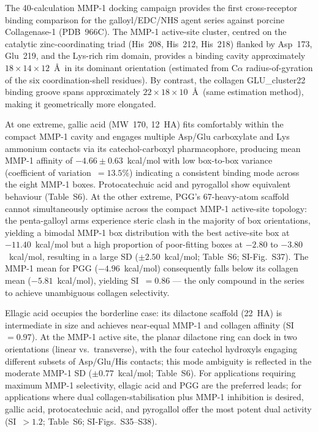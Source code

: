 \documentclass[11pt]{article}
\begin{document}
The 40-calculation MMP-1 docking campaign provides the first cross-receptor
binding comparison for the galloyl/EDC/NHS agent series against porcine
Collagenase-1 (PDB~966C).
The MMP-1 active-site cluster, centred on the catalytic zinc-coordinating
triad (His~208, His~212, His~218) flanked by Asp~173, Glu~219, and the
Lys-rich rim domain, provides a binding cavity approximately
$18 \times 14 \times 12$~\AA\ in its dominant orientation (estimated from
C$\alpha$ radius-of-gyration of the six coordination-shell residues).
By contrast, the collagen GLU\_cluster22 binding groove spans approximately
$22 \times 18 \times 10$~\AA\ (same estimation method), making it
geometrically more elongated.

At one extreme, gallic acid (MW~170, 12~HA) fits comfortably within the compact
MMP-1 cavity and engages multiple Asp/Glu carboxylate and Lys ammonium contacts
via its catechol-carboxyl pharmacophore, producing mean MMP-1 affinity of
$-4.66 \pm 0.63$~kcal/mol with low box-to-box variance (coefficient of
variation~$= 13.5\%$) indicating a consistent binding mode across the
eight MMP-1 boxes.
Protocatechuic acid and pyrogallol show equivalent behaviour (Table~S6).
At the other extreme, PGG's 67-heavy-atom scaffold cannot simultaneously
optimise across the compact MMP-1 active-site topology: the penta-galloyl arms
experience steric clash in the majority of box orientations, yielding a bimodal
MMP-1 box distribution with the best active-site box at $-11.40$~kcal/mol
but a high proportion of poor-fitting boxes at $-2.80$ to $-3.80$~kcal/mol,
resulting in a large SD ($\pm 2.50$~kcal/mol; Table~S6; SI-Fig.~S37).
The MMP-1 mean for PGG ($-4.96$~kcal/mol) consequently falls below its
collagen mean ($-5.81$~kcal/mol), yielding SI~$= 0.86$ --- the only compound
in the series to achieve unambiguous collagen selectivity.

Ellagic acid occupies the borderline case: its dilactone scaffold (22~HA) is
intermediate in size and achieves near-equal MMP-1 and collagen affinity
(SI~$= 0.97$).
At the MMP-1 active site, the planar dilactone ring can dock in two orientations
(linear vs.\ transverse), with the four catechol hydroxyls engaging different
subsets of Asp/Glu/His contacts; this mode ambiguity is reflected in the
moderate MMP-1 SD ($\pm 0.77$~kcal/mol; Table~S6).
For applications requiring maximum MMP-1 selectivity, ellagic acid and PGG are
the preferred leads; for applications where dual collagen-stabilisation plus
MMP-1 inhibition is desired, gallic acid, protocatechuic acid, and pyrogallol
offer the most potent dual activity (SI~$> 1.2$; Table~S6; SI-Figs.~S35--S38).
\end{document}
